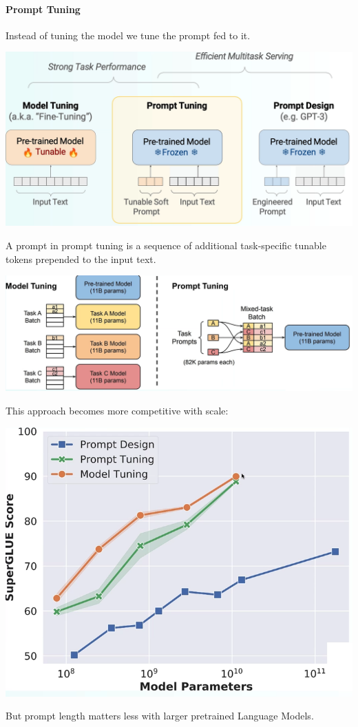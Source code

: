 \documentclass[10pt]{report}
\begin{document}
\paragraph{Prompt Tuning}
Instead of tuning the model we tune the prompt fed to it.
\begin{center}
	\includegraphics[scale=0.5]{88.png}
\end{center}
A prompt in prompt tuning is a sequence of additional task-specific tunable tokens prepended to the input text.
\begin{center}
	\includegraphics[scale=0.5]{89.png}
\end{center}
This approach becomes more competitive with scale:
\begin{center}
	\includegraphics[scale=0.5]{90.png}
\end{center}
But prompt length matters less with larger pretrained Language Models.
\end{document}

